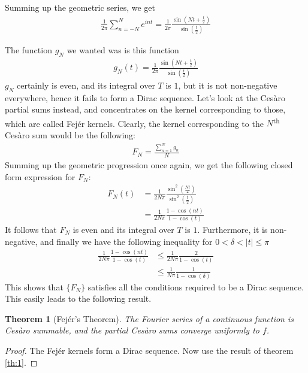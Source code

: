 \documentclass[12pt, titlepage]{article}
\newtheorem{thm}{Theorem}[section]
\theoremstyle{definition}
\begin{document}
Summing up the geometric series, we get
\begin{align*}
    \frac{1}{2\pi} \sum_{n = -N}^{N} e^{int} = \frac{1}{2\pi} \frac{\sin\left( Nt + \frac{t}{2} \right)}{\sin\left( \frac{t}{2} \right)}
\end{align*}

The function $g_N$ we wanted was is this function
\begin{align}
    g_N(t) = \frac{1}{2\pi} \frac{\sin\left( Nt + \frac{t}{2} \right)}{\sin\left( \frac{t}{2} \right)} \label{eq:5}
\end{align}
$g_N$ certainly is even, and its integral over $T$ is $1$, but it is not non-negative everywhere, hence it fails to form a Dirac sequence. Let's look at the Cesàro partial sums instead, and concentrates on the kernel corresponding to those, which are called Fejér kernels. Clearly, the kernel corresponding to the $N$\textsuperscript{th} Cesàro sum would be the following:
\begin{align*}
    F_N = \frac{\sum_{n=1}^{N} g_n}{N} 
\end{align*}
Summing up the geometric progression once again, we get the following closed form expression for $F_N$:
\begin{align*}
    F_N(t) &= \frac{1}{2N\pi} \frac{\sin^2 \left( \frac{Nt}{2} \right)}{\sin^2 \left( \frac{t}{2} \right)} \\
    & = \frac{1}{2N\pi} \frac{1 - \cos(nt)}{1 - \cos(t)}
\end{align*}
It follows that $F_N$ is even and its integral over $T$ is $1$. Furthermore, it is non-negative, and finally we have the following inequality for $0 < \delta < |t| \leq \pi$
\begin{align*}
    \frac{1}{2N\pi} \frac{1 - \cos(nt)}{1 - \cos(t)} &\leq \frac{1}{2N\pi} \frac{2}{1 - \cos(t)} \\
    &\leq \frac{1}{N\pi} \frac{1}{1 - \cos(\delta)}
\end{align*}
This shows that $\{F_N\}$ satisfies all the conditions required to be a Dirac sequence. This easily leads to the following result.

\begin{thm}[Fejér's Theorem] \label{th:2}
    The Fourier series of a continuous function is Cesàro summable, and the partial Cesàro sums converge uniformly to $f$.
\end{thm}

\begin{proof}
    The Fejér kernels form a Dirac sequence. Now use the result of theorem \ref{th:1}.
\end{proof}
\end{document}
